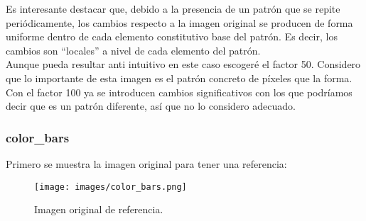 \documentclass[12pt,a4paper]{article}
\begin{document}
Es interesante destacar que, debido a la presencia de un patrón que se repite periódicamente, los cambios respecto a la imagen original se producen de forma uniforme dentro de cada elemento constitutivo base del patrón. Es decir, los cambios son ``locales'' a nivel de cada elemento del patrón.\\

Aunque pueda resultar anti intuitivo en este caso escogeré el factor 50. Considero que lo importante de esta imagen es el patrón concreto de píxeles que la forma. Con el factor 100 ya se introducen cambios significativos con los que podríamos decir que es un patrón diferente, así que no lo considero adecuado. \\

\subsubsection{color\_bars}
Primero se muestra la imagen original para tener una referencia:
\begin{figure}[H]
    \centering
    \texttt{[image: images/color\_bars.png]}
    \caption[Referencia - color\_bars]{Imagen original de referencia.}
    
\end{figure}

\vspace{0.5cm}
\end{document}
